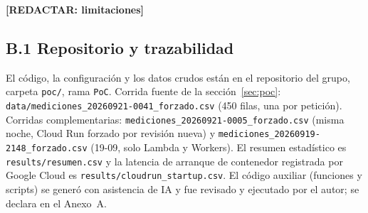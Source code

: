 \textbf{[REDACTAR: limitaciones]}




\subsection*{B.1 Repositorio y trazabilidad}

El código, la configuración y los datos crudos están en el repositorio del grupo,
carpeta \texttt{poc/}, rama \texttt{PoC}. Corrida fuente de la sección~\ref{sec:poc}:
\texttt{data/mediciones\_20260921-0041\_forzado.csv} (450 filas, una por petición).
Corridas complementarias: \texttt{mediciones\_20260921-0005\_forzado.csv} (misma
noche, Cloud Run forzado por revisión nueva) y
\texttt{mediciones\_20260919-2148\_forzado.csv} (19-09, solo Lambda y Workers).
El resumen estadístico es \texttt{results/resumen.csv} y la latencia de arranque de
contenedor registrada por Google Cloud es \texttt{results/cloudrun\_startup.csv}.
El código auxiliar (funciones y scripts) se generó con asistencia de IA y fue
revisado y ejecutado por el autor; se declara en el Anexo~A.

